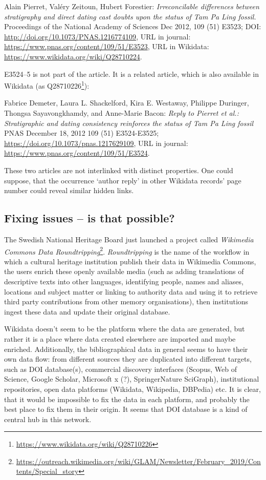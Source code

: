Alain Pierret, Valéry Zeitoun, Hubert Forestier: \emph{Irreconcilable differences between stratigraphy and direct dating cast doubts upon the status of Tam Pa Ling fossil.} Proceedings of the National Academy of Sciences Dec 2012, 109 (51) E3523; DOI: \url{http://doi.org/10.1073/PNAS.1216774109}, URL in journal: \url{https://www.pnas.org/content/109/51/E3523}, URL in Wikidata: \url{https://www.wikidata.org/wiki/Q28710224}.

E3524–5 is not part of the article. It is a related article, which is also available in Wikidata (as Q28710226\footnote{\url{https://www.wikidata.org/wiki/Q28710226}}):

Fabrice Demeter, Laura L. Shackelford, Kira E. Westaway, Philippe Duringer, Thongsa Sayavongkhamdy, and Anne-Marie Bacon: \emph{Reply to Pierret et al.: Stratigraphic and dating consistency reinforces the status of Tam Pa Ling fossil} PNAS December 18, 2012 109 (51) E3524-E3525; \url{https://doi.org/10.1073/pnas.1217629109}, URL in journal: \url{https://www.pnas.org/content/109/51/E3524}.

These two articles are not interlinked with distinct properties. One could suppose, that the occurrence `author reply' in other Wikidata records' page number could reveal similar hidden links.

\subsection{Fixing issues -- is that possible?}

The Swedish National Heritage Board just launched a project called \emph{Wikimedia Commons Data Roundtripping}\footnote{\url{https://outreach.wikimedia.org/wiki/GLAM/Newsletter/February_2019/Contents/Special_story}}. \emph{Roundtripping} is the name of the workflow in which a cultural heritage institution publish their data in Wikimedia Commons, the users enrich these openly available media (such as adding translations of descriptive texts into other languages, identifying people, names and aliases, locations and subject matter or linking to authority data and using it to retrieve third party contributions from other memory organisations), then institutions ingest these data and update their original database.

Wikidata doesn't seem to be the platform where the data are generated, but rather it is a place where data created elsewhere are imported and maybe enriched. Additionally, the bibliographical data in general seems to have their own data flow: from different sources they are duplicated into different targets, such as DOI database(s), commercial discovery interfaces (Scopus, Web of Science, Google Scholar, Microsoft x (?), SpringerNature SciGraph), institutional repositories, open data platforms (Wikidata, Wikipedia, DBPedia) etc. It is clear, that it would be impossible to fix the data in each platform, and probably the best place to fix them in their origin. It seems that DOI database is a kind of central hub in this network.

